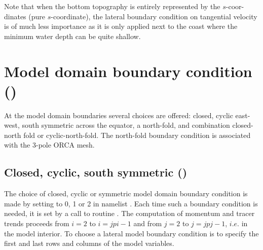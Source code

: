 \documentclass[../tex_main/NEMO_manual]{subfiles}
\begin{document}
Note that when the bottom topography is entirely represented by the $s$-coor-dinates 
(pure $s$-coordinate), the lateral boundary condition on tangential velocity is of much 
less importance as it is only applied next to the coast where the minimum water depth 
can be quite shallow.


\section{Model domain boundary condition (\protect{})}
\label{sec:LBC_jperio}

At the model domain boundaries several choices are offered: closed, cyclic east-west, 
south symmetric across the equator, a north-fold, and combination closed-north fold 
or cyclic-north-fold. The north-fold boundary condition is associated with the 3-pole ORCA mesh. 

\subsection{Closed, cyclic, south symmetric (\protect{})}
\label{subsec:LBC_jperio012}

The choice of closed, cyclic or symmetric model domain boundary condition is made 
by setting  to 0, 1 or 2 in namelist . Each time such a boundary 
condition is needed, it is set by a call to routine . The computation of 
momentum and tracer trends proceeds from $i=2$ to $i=jpi-1$ and from $j=2$ to 
$j=jpj-1$, $i.e.$ in the model interior. To choose a lateral model boundary condition 
is to specify the first and last rows and columns of the model variables. 
\end{document}
